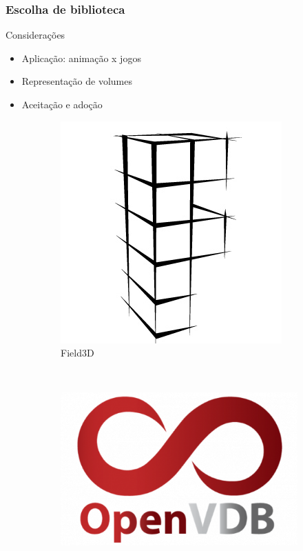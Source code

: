 \documentclass{beamer}
\begin{document}
\begin{frame}

\frametitle{Escolha de biblioteca}
Considerações
\begin{itemize}
\item Aplicação: animação x jogos
\item Representação de volumes
\item Aceitação e adoção
\end{itemize}

\begin{figure}[b]
        \centering
        \begin{subfigure}{0.3\textwidth}
                \includegraphics[width=\textwidth]{field3d}
                \caption*{Field3D}
        \end{subfigure}%
        ~ %
        \begin{subfigure}{0.3\textwidth}
                \includegraphics[width=\textwidth]{openvdbLogo}  

\end{subfigure}
\end{figure}
\end{frame}
\end{document}
